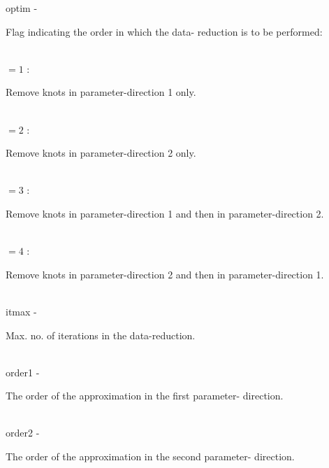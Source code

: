         \>\>    {\fov optim}\> - \>     \begin{minipg2}
                                Flag indicating the order in which the data-
                                reduction is to be performed:
                                \end{minipg2}\\[0.3ex]
                \>\>\>\>\>      $= 1$ :\>\begin{minipg5}
                                Remove knots in parameter-direction 1 only.
                                \end{minipg5}\\[0.3ex]
                \>\>\>\>\>      $= 2$ : \>\begin{minipg5}
                                Remove knots in parameter-direction 2 only.
                                \end{minipg5}\\[0.3ex]
                \>\>\>\>\>      $= 3$ : \>\begin{minipg5}
                                        Remove knots in parameter-direction 1
                                                and then in parameter-direction 2.
                                \end{minipg5}\\[0.3ex]
                \>\>\>\>\>      $= 4$ : \>\begin{minipg5}
                                        Remove knots in parameter-direction 2
                                                and then in parameter-direction 1.
                                \end{minipg5}\\[0.3ex]
        \>\>    {\fov itmax}\> - \>     \begin{minipg2}
                                Max. no. of iterations in the data-reduction.
                                \end{minipg2}\\
        \>\>    {\fov order1}\> - \>    \begin{minipg2}
                                The order of the approximation in the first parameter-
                                direction.
                                \end{minipg2}\\[0.8ex]
        \>\>    {\fov order2}\> - \>    \begin{minipg2}
                                The order of the approximation in the second parameter-
                                direction.
                                \end{minipg2}\\[0.8ex]
